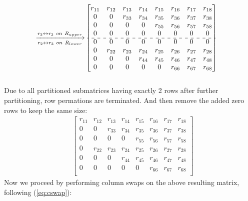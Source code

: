 \documentclass[conference]{IEEEtran}
\numberwithin{equation}{section}
\begin{document}
\begin{align*}
\xrightarrow[r_{2} \leftrightarrow r_{3}\ on\ R_{lower}]{r_{2} \leftrightarrow r_{3}\ on\ R_{upper}}
&\begin{bmatrix}
 r_{11} & r_{12} & r_{13} & r_{14} & r_{15} & r_{16} & r_{17} & r_{18}\\
 0      & 0      & r_{33} & r_{34} & r_{35} & r_{36} & r_{37} & r_{38}\\
 0      & 0      & 0      & 0      & r_{55} & r_{56} & r_{57} & r_{58}\\
 0      & 0      & 0      & 0      & 0      & 0      &  0     & 0     \\
\cdashline{1-8}
 0      & 0      & 0      & 0      & 0      & 0      & 0      & 0     \\
 0      & r_{22} & r_{23} & r_{24} & r_{25} & r_{26} & r_{27} & r_{28}\\
 0      & 0      & 0      & r_{44} & r_{45} & r_{46} & r_{47} & r_{48}\\
 0      & 0      & 0      & 0      & 0      & r_{66} & r_{67} & r_{68}\\
\end{bmatrix}
\end{align*}\\
Due to all partitioned submatrices having exactly 2 rows after further partitioning, row permations are terminated. And then remove the added zero rows to keep the same size:
\begin{align*}
&\begin{bmatrix}
 r_{11} & r_{12} & r_{13} & r_{14} & r_{15} & r_{16} & r_{17} & r_{18}\\
 0      & 0      & r_{33} & r_{34} & r_{35} & r_{36} & r_{37} & r_{38}\\
 0      & 0      & 0      & 0      & r_{55} & r_{56} & r_{57} & r_{58}\\
 0      & r_{22} & r_{23} & r_{24} & r_{25} & r_{26} & r_{27} & r_{28}\\
 0      & 0      & 0      & r_{44} & r_{45} & r_{46} & r_{47} & r_{48}\\
 0      & 0      & 0      & 0      & 0      & r_{66} & r_{67} & r_{68}\\
\end{bmatrix}
\end{align*}
Now we proceed by performing column swaps on the above resulting matrix, following (\ref{eq:cswap}):
\end{document}
